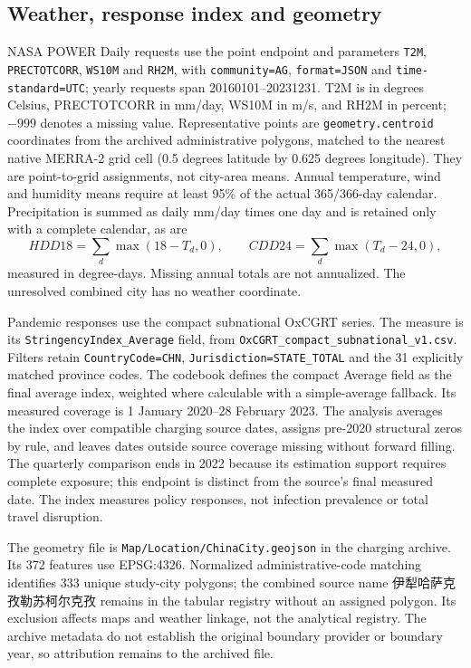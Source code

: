 \subsection{Weather, response index and geometry}
NASA POWER Daily requests use the point endpoint and parameters
\texttt{T2M}, \texttt{PRECTOTCORR}, \texttt{WS10M} and \texttt{RH2M}, with
\texttt{community=AG}, \texttt{format=JSON} and
\texttt{time-standard=UTC}; yearly requests span 20160101--20231231.  T2M is
in degrees Celsius, PRECTOTCORR in mm/day, WS10M in m/s, and RH2M in percent;
$-999$ denotes a missing value.  Representative points are
\texttt{geometry.centroid} coordinates from the archived administrative
polygons, matched to the nearest native MERRA-2 grid cell (0.5 degrees
latitude by 0.625 degrees longitude).  They are point-to-grid assignments, not
city-area means.  Annual temperature, wind and humidity means require at least
95\% of the actual 365/366-day calendar.  Precipitation is summed as daily
mm/day times one day and is retained only with a complete calendar, as are
\[
 HDD18=\sum_d\max(18-T_d,0),\qquad
 CDD24=\sum_d\max(T_d-24,0),
\]
measured in degree-days.  Missing annual totals are not annualized.  The
unresolved combined city has no weather coordinate.

\begin{sloppypar}
Pandemic responses use the compact subnational OxCGRT series. The measure is its \texttt{Stringency\allowbreak{}Index\_\allowbreak{}Average} field, from \texttt{OxCGRT\_\allowbreak{}compact\_\allowbreak{}subnational\_\allowbreak{}v1.csv}. Filters
retain \texttt{CountryCode=CHN},
\texttt{Jurisdiction=STATE\_\allowbreak{}TOTAL} and the 31 explicitly matched
province codes.  The codebook defines the compact Average field as the final
average index, weighted where calculable with a simple-average fallback.  Its
measured coverage is 1 January 2020--28 February 2023.  The analysis averages
the index over compatible charging source dates, assigns pre-2020 structural
zeros by rule, and leaves dates outside source coverage missing without forward
filling.  The quarterly comparison ends in 2022 because its estimation support
requires complete exposure; this endpoint is distinct from the source's final
measured date.  The index measures policy responses, not infection prevalence
or total travel disruption.
\end{sloppypar}

The geometry file is \texttt{Map/Location/ChinaCity.geojson} in the charging
archive.  Its 372 features use EPSG:4326.  Normalized administrative-code
matching identifies 333 unique study-city polygons; the combined source name
伊犁哈萨克孜勒苏柯尔克孜 remains in the tabular registry without an assigned
polygon.  Its exclusion affects maps and weather linkage, not the analytical
registry.  The archive metadata do not establish the original boundary provider
or boundary year, so attribution remains to the archived file.
